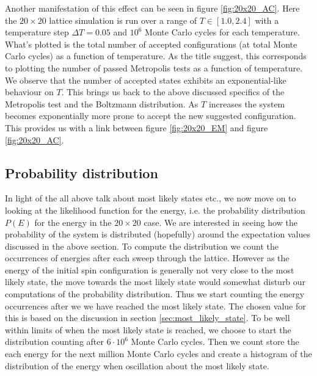 \documentclass[12pt]{article}
\numberwithin{figure}{section}
\numberwithin{table}{section}
\begin{document}
\noindent Another manifestation of this effect can be seen in figure \ref{fig:20x20_AC}. Here the $20\times20$ lattice simulation is run over a range of $T\in[1.0,2.4]$ with a temperature step $\Delta T=0.05$ and $10^6$ Monte Carlo cycles for each temperature. What's plotted is the total number of accepted configurations (at total Monte Carlo cycles) as a function of temperature. As the title suggest, this corresponds to plotting the number of passed Metropolis tests as a function of temperature. We observe that the number of accepted states exhibits an exponential-like behaviour on $T$. This brings us back to the above discussed specifics of the Metropolis test and the Boltzmann distribution. As $T$ increases the system becomes exponentially more prone to accept the new suggested configuration. This provides us with a link between figure \ref{fig:20x20_EM} and figure \ref{fig:20x20_AC}.


\subsection{Probability distribution}
In light of the all above talk about most likely states etc., we now move on to looking at the likelihood function for the energy, i.e. the probability distribution $P(E)$ for the energy in the $20\times20$ case. We are interested in seeing how the probability of the system is distributed (hopefully) around the expectation values discussed in the above section. To compute the distribution we count the occurrences of energies after each sweep through the lattice. However as the energy of the initial spin configuration is generally not very close to the most likely state, the move towards the most likely state would somewhat disturb our computations of the probability distribution. Thus we start counting the energy occurrences after we we have reached the most likely state. The chosen value for this is based on the discussion in section \ref{sec:most_likely_state}. To be well within limits of when the most likely state is reached, we choose to start the distribution counting after $6\cdot10^6$ Monte Carlo cycles. Then we count store the each energy for the next million Monte Carlo cycles and create a histogram of the distribution of the energy when oscillation about the most likely state.
\end{document}
